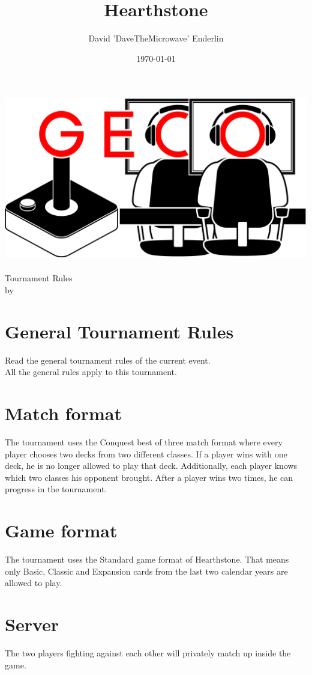 \documentclass{article}
\title{Hearthstone}
\author{David 'DaveTheMicrowave' Enderlin}
\date{\today}
\begin{document}
\makeatletter
\begin{titlepage}
\centering
\includegraphics[scale=0.075]{../img/GECo.png}\\
\LARGE \@title\\ Tournament Rules\\ \normalsize by \@author\\ \@date
\end{titlepage}
\makeatother


\clearpage

\tableofcontents
\clearpage

\section{General Tournament Rules}
Read the general tournament rules of the current event.\\
All the general rules apply to this tournament.

\section{Match format}
The tournament uses the Conquest best of three match format where every player chooses two decks from two different classes. If a player wins with one deck, he is no longer allowed to play that deck. Additionally, each player knows which two classes his opponent brought. After a player wins two times, he can progress in the tournament.

\section{Game format}
The tournament uses the Standard game format of Hearthstone. That means only Basic, Classic and Expansion cards from the last two calendar years are allowed to play.

\section{Server}
The two players fighting against each other will privately match up inside the game.
\end{document}

